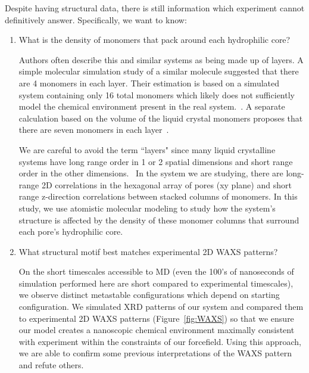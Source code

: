 \documentclass[journal=jpcbfk,manuscript=article]{achemso}
\begin{document}
 Despite having structural data, there is still information which experiment
 cannot definitively answer. Specifically, we want to know:
 \begin{enumerate}
    \item What is the density of monomers that pack around each hydrophilic core? 
    \label{point:monomernum}

 	Authors often describe this and similar systems as being made up of layers. A simple
 	molecular simulation study of a similar molecule suggested that there are 4 monomers
 	in each layer. Their estimation is based on a simulated system containing only 16 total
 	monomers which likely does not sufficiently model the chemical environment present in
 	the real system.~\cite{zhu_methacrylated_2006}. A separate calculation based on the 
 	volume of the liquid crystal monomers proposes that there are seven monomers in each 
 	layer~\cite{resel_structural_2000}. 

  	We are careful to avoid the term ``layers" since many liquid crystalline systems
 	have long range order in 1 or 2 spatial dimensions and short range order in 	
 	the other dimensions.~\cite{chaikin_principles_1995}  %
 	In the system we are studying, there are long-range 2D correlations in the 
 	hexagonal array of pores (xy plane) and short range z-direction correlations between 
        stacked columns of monomers. In this study, we use atomistic molecular modeling
        to study how the system's structure is affected by the density of these monomer columns
        that surround each pore's hydrophilic core. 

	\item What structural motif best matches experimental 2D WAXS patterns?\label{point:xrdmatch}

	On the short timescales accessible to MD (even the 100's of nanoseconds of simulation 
	performed here are short compared to experimental timescales), we observe distinct metastable
	configurations which depend on starting configuration. We simulated XRD patterns of our system and 
	compared them to experimental 2D WAXS patterns (Figure~\ref{fig:WAXS}) so that we ensure our
	model creates a nanoscopic chemical environment maximally consistent with experiment within 
	the constraints	of our forcefield. Using this approach, we are able to confirm some previous
	interpretations	of the WAXS pattern and refute others. 
	


\end{enumerate}
\end{document}
